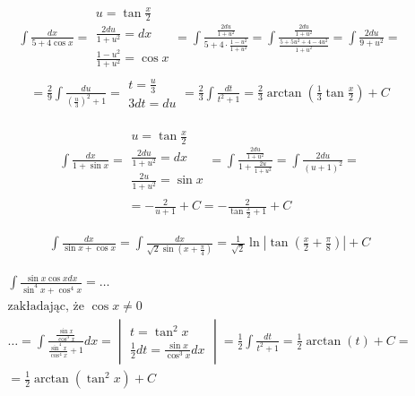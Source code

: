 
\begin{gather*}\int \frac{dx}{5+4\cos x} = \begin{array}{|l|} u=\tan \frac{x}{2} \\ \frac{2du}{1+u^2}=dx \\ \frac{1-u^2}{1+u^2}=\cos x \end{array} = \int \frac{\frac{2du}{1+u^2}}{5+4\cdot\frac{1-u^2}{1+u^2}} = \int \frac{\frac{2du}{1+u^2}}{\frac{5+5u^2+4-4u^2}{1+u^2}} = \int \frac{2du}{9+u^2} = \end{gather*}
 \begin{gather*}= \frac{2}{9} \int \frac{du}{(\frac{u}{3})^2+1} = \begin{array}{|l|} t=\frac{u}{3} \\ 3dt=du \end{array} = \frac{2}{3}\int \frac{dt}{t^2+1} = \frac{2}{3}\arctan\left(\frac{1}{3}\tan \frac{x}{2}\right)+C\end{gather*}



\begin{gather*}\int \frac{dx}{1+\sin x} = \begin{array}{|l|} u=\tan \frac{x}{2} \\ \frac{2du}{1+u^2}=dx \\ \frac{2u}{1+u^2}=\sin x \end{array} = \int \frac{\frac{2du}{1+u^2}}{1+\frac{2u}{1+u^2}} = \int \frac{2du}{(u+1)^2} = \end{gather*}
 \begin{gather*}= -\frac{2}{u+1}+C = -\frac{2}{\tan \frac{x}{2}+1}+C\end{gather*}



\begin{gather*}\int \frac{dx}{\sin x + \cos x} = \int \frac{dx}{\sqrt{2}\sin (x+\frac{\pi}{4})} = \frac{1}{\sqrt{2}}\ln|\tan (\frac{x}{2}+\frac{\pi}{8})|+C\end{gather*}



\begin{gather*}\int \frac{\sin x \cos x dx}{\sin^4 x + \cos^4 x}= \ldots \\
  \text{zakładając, że } \cos x\neq 0 \\
  \ldots = \int \frac{\frac{\sin x}{\cos^3x}}{\frac{\sin^4x}{\cos^4x}+1}dx =
  \begin{vmatrix}
    t=\tan^2 x \\
    \frac{1}{2}dt=\frac{\sin x}{\cos^3 x}dx
  \end{vmatrix}
  = \frac{1}{2}\int \frac{dt}{t^2+1}
  = \frac{1}{2}\arctan (t)+C =  \\
  = \frac{1}{2}\arctan (\tan^2 x)+C
\end{gather*}



